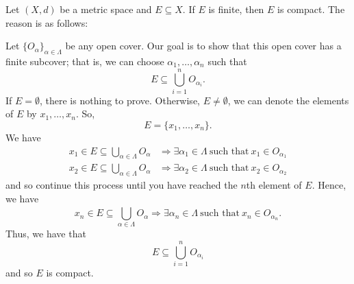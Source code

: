 \documentclass[a4paper]{report}
\begin{document}
\begin{eg}
    Let \( (X,d) \) be a metric space and \( E \subseteq  X \). If \( E  \) is finite, then \( E  \) is compact. The reason is as follows: 

    Let \( \{ {O}_{\alpha} \}_{\alpha \in \Lambda} \) be any open cover. Our goal is to show that this open cover has a finite subcover; that is, we can choose \( {\alpha}_{1}, \dots, {\alpha}_{n} \) such that 
    \[  E \subseteq \bigcup_{ i=1  }^{ n }  {O}_{{\alpha}_{i}}. \]
    If \( E = \emptyset \), there is nothing to prove. Otherwise, \( E \neq \emptyset \), we can denote the elements of \( E  \) by \( {x}_{1}, \dots, {x}_{n} \). So, 
    \[ E = \{ {x}_{1}, \dots, {x}_{n} \}. \]
    We have
    \begin{align*}
        {x}_{1} \in E \subseteq  \bigcup_{ \alpha \in \Lambda }^{  } {O}_{\alpha} &\Longrightarrow \exists {\alpha}_{1} \in \Lambda \ \text{such that} \ {x}_{1} \in {O}_{{\alpha}_{1}} \\
        {x}_{2} \in E \subseteq  \bigcup_{ \alpha \in \Lambda }^{  }  {O}_{\alpha} &\Longrightarrow \exists {\alpha}_{2} \in \Lambda \ \text{such that} \ {x}_{2} \in {O}_{{\alpha}_{2}}
    \end{align*}
    and so continue this process until you have reached the \( n \)th element of \( E \). Hence, we have
    \[  {x}_{n} \in E \subseteq \bigcup_{ \alpha \in \Lambda }^{  } {O}_{\alpha} \Longrightarrow \exists {\alpha}_{n} \in \Lambda \ \text{such that} \ {x}_{n} \in {O}_{{\alpha}_{n}}. \]
    Thus, we have that
    \[  E \subseteq \bigcup_{ i=1  }^{ n } {O}_{{\alpha}_{i}} \]
    and so \( E  \) is compact.
\end{eg}
\end{document}
